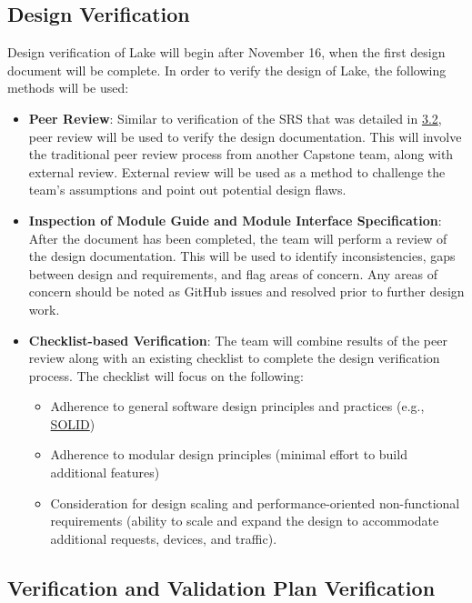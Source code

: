 \documentclass[12pt, titlepage]{article}
\begin{document}
\subsection{Design Verification}
\label{sec:DesignVer}

Design verification of Lake will begin after November 16, when the first design document will be complete. In order to verify the design of Lake, the following methods will be used:

\begin{itemize}
  \item \textbf{Peer Review}: Similar to verification of the SRS that was detailed in \hyperref[sec:SRSVer]{3.2}, peer review will be used to verify the design documentation.
  This will involve the traditional peer review process from another Capstone team, along with external review. External review will be used as a method to challenge the team's assumptions
  and point out potential design flaws.
  \item \textbf{Inspection of Module Guide and Module Interface Specification}: After the document has been completed, the team will perform a review of the design documentation.
  This will be used to identify inconsistencies, gaps between design and requirements, and flag areas of concern. Any areas of concern should be noted as GitHub issues and resolved prior to further design work.
  \item \textbf{Checklist-based Verification}: The team will combine results of the peer review along with an existing checklist to complete the design verification process. The checklist will focus on the following:
    \begin{itemize}
      \item Adherence to general software design principles and practices (e.g., \hyperref[SOLID]{SOLID})
      \item Adherence to modular design principles (minimal effort to build additional features)
      \item Consideration for design scaling and performance-oriented non-functional requirements (ability to scale and expand the design to accommodate additional requests, devices, and traffic).
    \end{itemize}
\end{itemize}


\subsection{Verification and Validation Plan Verification}
\label{sec:VnVVer}
\end{document}
